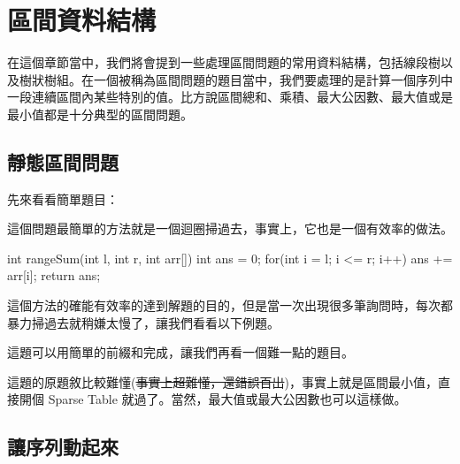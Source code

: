 \chapter{區間資料結構}

在這個章節當中，我們將會提到一些處理區間問題的常用資料結構，包括線段樹以及樹狀樹組。在一個被稱為區間問題的題目當中，我們要處理的是計算一個序列中一段連續區間內某些特別的值。比方說區間總和、乘積、最大公因數、最大值或是最小值都是十分典型的區間問題。\\

\section{靜態區間問題}

先來看看簡單題目：\\


這個問題最簡單的方法就是一個迴圈掃過去，事實上，它也是一個有效率的做法。\\

\begin{C++}
int rangeSum(int l, int r, int arr[]){
	int ans = 0;	
	for(int i = l; i <= r; i++)
		ans += arr[i];
	return ans;
}
\end{C++}

這個方法的確能有效率的達到解題的目的，但是當一次出現很多筆詢問時，每次都暴力掃過去就稍嫌太慢了，讓我們看看以下例題。


這題可以用簡單的前綴和完成，讓我們再看一個難一點的題目。\\


這題的原題敘比較難懂(\sout{事實上超難懂，還錯誤百出})，事實上就是區間最小值，直接開個 Sparse Table 就過了。當然，最大值或最大公因數也可以這樣做。

\section{讓序列動起來}

